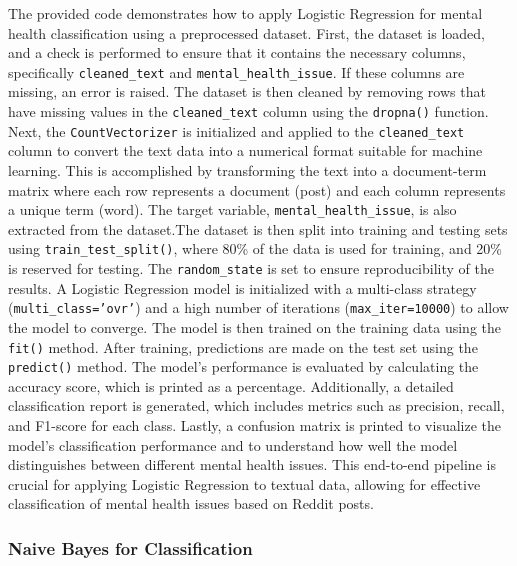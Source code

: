 \noindent
The provided code demonstrates how to apply Logistic Regression for mental health classification using a preprocessed dataset. First, the dataset is loaded, and a check is performed to ensure that it contains the necessary columns, specifically \texttt{cleaned\_text} and \texttt{mental\_health\_issue}. If these columns are missing, an error is raised. The dataset is then cleaned by removing rows that have missing values in the \texttt{cleaned\_text} column using the \texttt{dropna()} function. Next, the \texttt{CountVectorizer} is initialized and applied to the \texttt{cleaned\_text} column to convert the text data into a numerical format suitable for machine learning. This is accomplished by transforming the text into a document-term matrix where each row represents a document (post) and each column represents a unique term (word). The target variable, \texttt{mental\_health\_issue}, is also extracted from the dataset.The dataset is then split into training and testing sets using \texttt{train\_test\_split()}, where 80\% of the data is used for training, and 20\% is reserved for testing. The \texttt{random\_state} is set to ensure reproducibility of the results. A Logistic Regression model is initialized with a multi-class strategy (\texttt{multi\_class='ovr'}) and a high number of iterations (\texttt{max\_iter=10000}) to allow the model to converge. The model is then trained on the training data using the \texttt{fit()} method. After training, predictions are made on the test set using the \texttt{predict()} method. The model's performance is evaluated by calculating the accuracy score, which is printed as a percentage. Additionally, a detailed classification report is generated, which includes metrics such as precision, recall, and F1-score for each class. Lastly, a confusion matrix is printed to visualize the model's classification performance and to understand how well the model distinguishes between different mental health issues. This end-to-end pipeline is crucial for applying Logistic Regression to textual data, allowing for effective classification of mental health issues based on Reddit posts.


\subsubsection{Naive Bayes for Classification}

